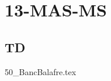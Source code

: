 \clearpage
\chapter{13-MAS-MS}

\section{TD}

\setcounter{question}{0}
{}
\graphicspath{{../13-MAS-MS/TD/50_BancBalafre/images/}{../13-MAS-MS/TD/50_BancBalafre/}{../Style/png/}}
{50_BancBalafre.tex}

